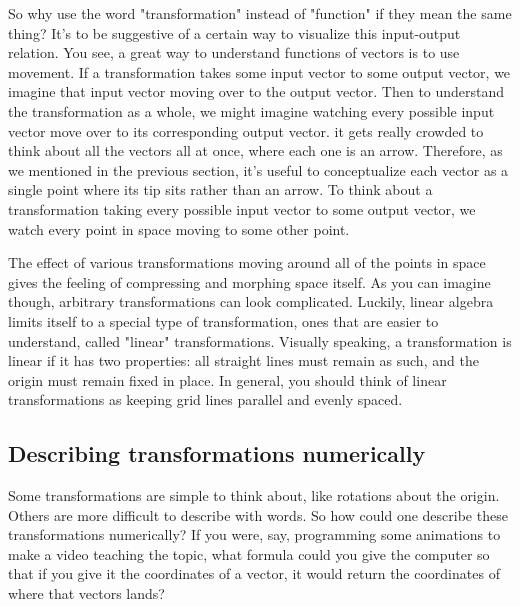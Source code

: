 So why use the word "transformation" instead of "function" if they mean the same
thing? It's to be suggestive of a certain way to visualize this input-output
relation. You see, a great way to understand functions of vectors is to use
movement. If a transformation takes some input vector to some output vector, we
imagine that input vector moving over to the output vector. Then to understand
the transformation as a whole, we might imagine watching every possible input
vector move over to its corresponding output vector. it gets really crowded to
think about all the vectors all at once, where each one is an arrow. Therefore,
as we mentioned in the previous section, it's useful to conceptualize each
vector as a single point where its tip sits rather than an arrow. To think about
a transformation taking every possible input vector to some output vector, we
watch every point in space moving to some other point.

The effect of various transformations moving around all of the points in space
gives the feeling of compressing and morphing space itself. As you can imagine
though, arbitrary transformations can look complicated. Luckily, linear algebra
limits itself to a special type of transformation, ones that are easier to
understand, called "linear" transformations. Visually speaking, a transformation
is linear if it has two properties: all straight lines must remain as such, and
the origin must remain fixed in place. In general, you should think of linear
transformations as keeping grid lines parallel and evenly spaced.

\subsection{Describing transformations numerically}

Some transformations are simple to think about, like rotations about the origin.
Others are more difficult to describe with words. So how could one describe
these transformations numerically? If you were, say, programming some animations
to make a video teaching the topic, what formula could you give the computer so
that if you give it the coordinates of a vector, it would return the coordinates
of where that vectors lands?

\begin{figure}[H]
  \centering

\end{figure}

